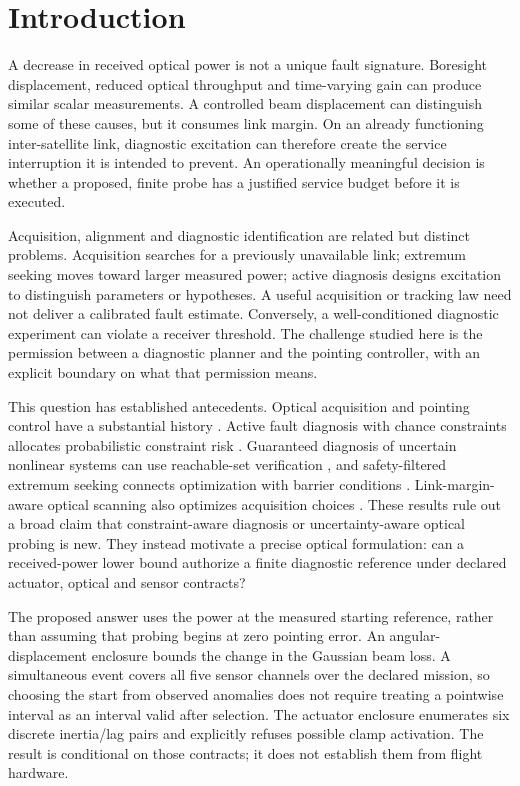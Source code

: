 \section{Introduction}
A decrease in received optical power is not a unique fault signature. Boresight displacement, reduced optical throughput and time-varying gain can produce similar scalar measurements. A controlled beam displacement can distinguish some of these causes, but it consumes link margin. On an already functioning inter-satellite link, diagnostic excitation can therefore create the service interruption it is intended to prevent. An operationally meaningful decision is whether a proposed, finite probe has a justified service budget before it is executed.

Acquisition, alignment and diagnostic identification are related but distinct problems. Acquisition searches for a previously unavailable link; extremum seeking moves toward larger measured power; active diagnosis designs excitation to distinguish parameters or hypotheses. A useful acquisition or tracking law need not deliver a calibrated fault estimate. Conversely, a well-conditioned diagnostic experiment can violate a receiver threshold. The challenge studied here is the permission between a diagnostic planner and the pointing controller, with an explicit boundary on what that permission means.

This question has established antecedents. Optical acquisition and pointing control have a substantial history \cite{guelman}. Active fault diagnosis with chance constraints allocates probabilistic constraint risk \cite{guo}. Guaranteed diagnosis of uncertain nonlinear systems can use reachable-set verification \cite{massa}, and safety-filtered extremum seeking connects optimization with barrier conditions \cite{safees}. Link-margin-aware optical scanning also optimizes acquisition choices \cite{yan}. These results rule out a broad claim that constraint-aware diagnosis or uncertainty-aware optical probing is new. They instead motivate a precise optical formulation: can a received-power lower bound authorize a finite diagnostic reference under declared actuator, optical and sensor contracts?

The proposed answer uses the power at the measured starting reference, rather than assuming that probing begins at zero pointing error. An angular-displacement enclosure bounds the change in the Gaussian beam loss. A simultaneous event covers all five sensor channels over the declared mission, so choosing the start from observed anomalies does not require treating a pointwise interval as an interval valid after selection. The actuator enclosure enumerates six discrete inertia/lag pairs and explicitly refuses possible clamp activation. The result is conditional on those contracts; it does not establish them from flight hardware.


